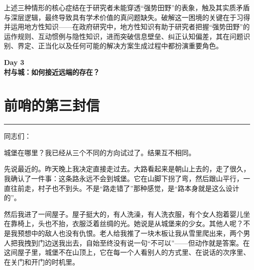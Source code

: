 \documentclass[12pt,a4paper]{article}
\begin{document}
上述三种情形的核心症结在于研究者未能穿透“强势田野”的表象，触及其实质矛盾与深层逻辑，最终导致具有学术价值的真问题缺失。破解这一困境的关键在于习得并运用地方性知识——在政府研究中，地方性知识有助于研究者把握“强势田野”的运作规则、互动惯例与隐性知识，进而突破信息壁垒、纠正认知偏差，其在问题识别、界定、正当化以及任何可能的解决方案生成过程中都扮演重要角色。
\par{}
\newpage
\begin{center}
{\LARGE \bfseries Day 3\\[1em]村与城：如何接近远端的存在？}
\end{center}
\vspace{3em}
\section{前哨的第三封信}
\vspace{0.5em}
\vspace{0.3em}

\noindent\rule{\textwidth}{0.4pt}

\vspace{0.3em}



同志们：



城堡在哪里？我已经从三个不同的方向试过了。结果互不相同。



先说最近的。昨天晚上我决定直接走过去。大路看起来是朝山上去的，走了很久，我确认了一件事：这条路永远不会到城堡。它在山脚下拐了弯，然后跟山平行，一直往前走，村子也不到头。不是“路走错了”那种感觉，是“路本身就是这么设计的”。



然后我进了一间屋子。屋子挺大的，有人洗澡，有人洗衣服，有个女人抱着婴儿坐在靠椅上，头也不抬，衣服泛着丝绸的光。她说是从城堡来的少女。其他人呢？不是我预想中的敌人也没有仇恨。老人给我推了一块木板让我从雪里爬出来，两个男人把我拽到门边送我出去，自始至终没有说一句“不可以”——但动作就是答案。在这间屋子里，城堡不在山顶上，它在每一个人看别人的方式里、在说话的次序里、在关门和开门的时机里。
\end{document}

